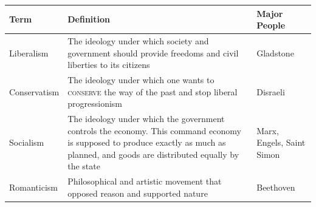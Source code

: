\documentclass[12pt]{article}
\begin{document}
\begin{enumerate}
\begin{tabular}{|p{}|p{}|p{}|}
\hline
Term & Definition & Major People \\
\hline
Liberalism & The ideology under which society and government should provide freedoms and civil liberties to its citizens & Gladstone \\
\hline
Conservatism & The ideology under which one wants to \textsc{conserve} the way of the past and stop liberal progressionism & Disraeli \\
\hline
Socialism & The ideology under which the government controls the economy. This command economy is supposed to produce exactly as much as planned, and goods are distributed equally by the state  & Marx, Engels, Saint Simon \\
\hline
Romanticism & Philosophical and artistic movement that opposed reason and supported nature & Beethoven \\
\hline
\end{tabular}
 
\hspace{-25pt} \begin{tabular}{|p{}|p{}|p{}|p{}|p{}|}


\end{tabular}
\end{enumerate}
\end{document}
